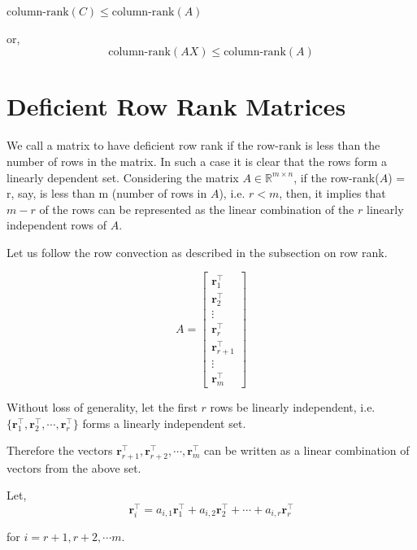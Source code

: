 \documentclass[a4paper]{article}
\begin{document}
$\text{column-rank}(C) \leq \text{column-rank}(A)$

or, \begin{equation}
\text{column-rank}(AX) \leq \text{column-rank}(A)
\end{equation}

\section{Deficient Row Rank Matrices}

We call a matrix to have deficient row rank if the row-rank is less than the number of rows in the matrix. In such a case it is clear that the rows form a linearly dependent set. Considering the matrix $A \in \mathbb{R}^{m \times n}$, if the row-rank($A$) = r, say, is less than m (number of rows in $A$), i.e. $r < m$, then, it implies that $m-r$ of the rows can be represented as the linear combination of the $r$ linearly independent rows of $A$.

Let us follow the row convection as described in the subsection on row rank.

\begin{equation}
A = \begin{bmatrix}
\boldsymbol{r}_1^{\top} \\ \boldsymbol{r}_2^{\top} \\ \vdots \\ 
\boldsymbol{r}_{r}^{\top} \\
\boldsymbol{r}_{r+1}^{\top} \\ \vdots \\ 
\boldsymbol{r}_m^{\top} 
\end{bmatrix}
\end{equation}

Without loss of generality, let the first $r$ rows be linearly independent, i.e. $\{\boldsymbol{r}_{1}^{\top}, \boldsymbol{r}_{2}^{\top}, \cdots, \boldsymbol{r}_{r}^{\top}\}$ forms a linearly independent set.

Therefore the vectors $\boldsymbol{r}_{r+1}^{\top}, \boldsymbol{r}_{r+2}^{\top}, \cdots, \boldsymbol{r}_{m}^{\top}$ can be written as a linear combination of vectors from the above set.

Let,
\begin{equation}
\boldsymbol{r}_{i}^{\top} = a_{i,1}\boldsymbol{r}_{1}^{\top} + a_{i,2}\boldsymbol{r}_{2}^{\top} + \cdots + a_{i,r}\boldsymbol{r}_{r}^{\top}
\end{equation}

for $i = r+1, r+2, \cdots m$.
\end{document}
